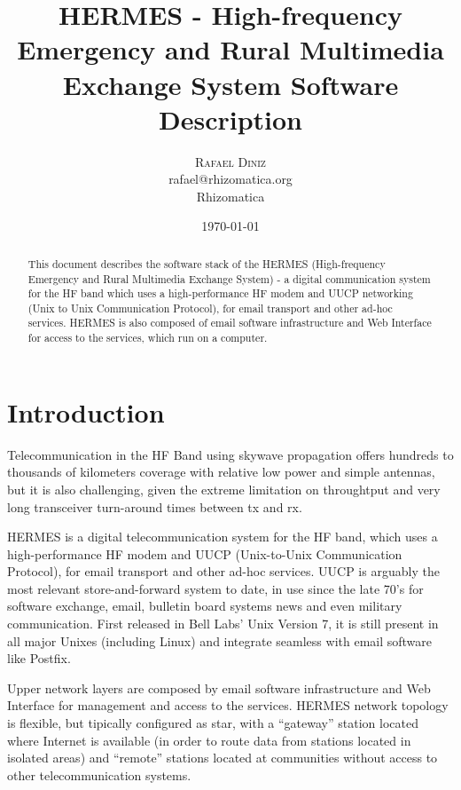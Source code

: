 \documentclass[11pt,a4paper]{article}
\title{HERMES - High-frequency Emergency and Rural Multimedia Exchange
  System Software Description}
\author{
       \large
        \textsc{Rafael Diniz}
        \mbox{}\\ %
        rafael@rhizomatica.org\\
        \mbox{Rhizomatica} \\ %
}
\date{\today}
\begin{document}
\maketitle

\begin{abstract}

This document describes the software stack of the HERMES (High-frequency Emergency and Rural Multimedia Exchange System)
- a digital communication system for the HF band which uses a
high-performance HF modem and UUCP networking (Unix to Unix
Communication Protocol), for email transport and other ad-hoc
services. HERMES is also composed of email software infrastructure and
Web Interface for access to the services, which run on a computer.

\end{abstract}

\newpage

\tableofcontents

\section{Introduction}

  Telecommunication in the HF Band using skywave propagation offers hundreds to thousands
  of kilometers coverage with relative low power and simple antennas, but it is also challenging,
  given the extreme limitation on throughtput  and very long transceiver turn-around times between tx and rx.

  HERMES is a digital telecommunication system for the HF band, which uses a high-performance HF modem and UUCP
  (Unix-to-Unix Communication Protocol), for email transport and other ad-hoc services.
  UUCP is arguably the most relevant store-and-forward system to date, in use since the late 70's
  for software exchange, email, bulletin board systems  news and even military communication. First released
  in Bell Labs' Unix Version 7, it is still present in all major Unixes (including Linux) and integrate seamless
  with email software like Postfix.

  Upper network layers are composed by email software infrastructure and Web Interface for management and access to the services.
  HERMES network topology is flexible, but tipically configured as star, with a ``gateway'' station located where Internet is available
  (in order to route data from stations located in isolated areas) and ``remote'' stations located at communities without access to
  other telecommunication systems.
\end{document}
